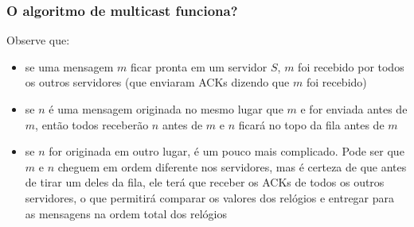 \documentclass[Ligatures=TeX,table,brazil,svgnames,usetotalslideindicator,compress,10pt]{beamer}
\begin{document}
\begin{frame}
  \frametitle{O algoritmo de multicast funciona?}

  Observe que:
  \begin{itemize}
  \item se uma mensagem $m$ ficar pronta em um servidor $S$, $m$ foi
    recebido por todos os outros servidores (que enviaram ACKs dizendo
    que $m$ foi recebido)
  \item se $n$ é uma mensagem originada no mesmo lugar que $m$ e for
    enviada antes de $m$, então todos receberão $n$ antes de $m$ e $n$
    ficará no topo da fila antes de $m$
  \item se $n$ for originada em outro lugar, é um pouco mais
    complicado. Pode ser que $m$ e $n$ cheguem em ordem diferente nos
    servidores, mas é certeza de que antes de tirar um deles da fila,
    ele terá que receber os ACKs de todos os outros servidores, o que
    permitirá comparar os valores dos relógios e entregar para as
    mensagens na ordem total dos relógios
  \end{itemize}

\end{frame}
\end{document}
